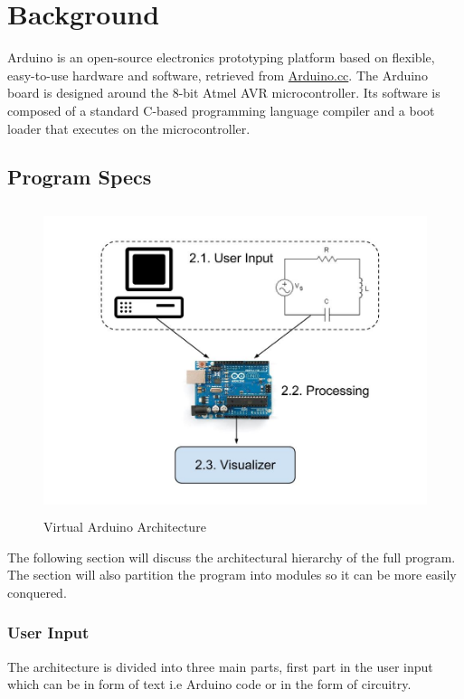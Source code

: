 \chapter{Background}\label{chap:background}

Arduino is an open-source electronics prototyping platform based on flexible, easy-to-use hardware and software, retrieved from \href{http://arduino.cc/en/}{Arduino.cc}. The Arduino board is designed around the 8-bit Atmel AVR microcontroller. Its software is composed of a standard C-based programming language compiler and a boot loader that executes on the microcontroller.



\section{Program Specs}

\begin{figure}[h!]
\centering
\includegraphics[height=9cm, width=12cm]{Hierarchy.jpg}
\caption{Virtual Arduino Architecture}
\label{Architecture}
\end{figure}
The following section will discuss the architectural hierarchy of the full program. The section will also partition the program into modules so it can be more easily conquered. 

\subsection{User Input}
The architecture is divided into three main parts, first part in the user input which can be in form  of text i.e Arduino code or in the form of circuitry.

